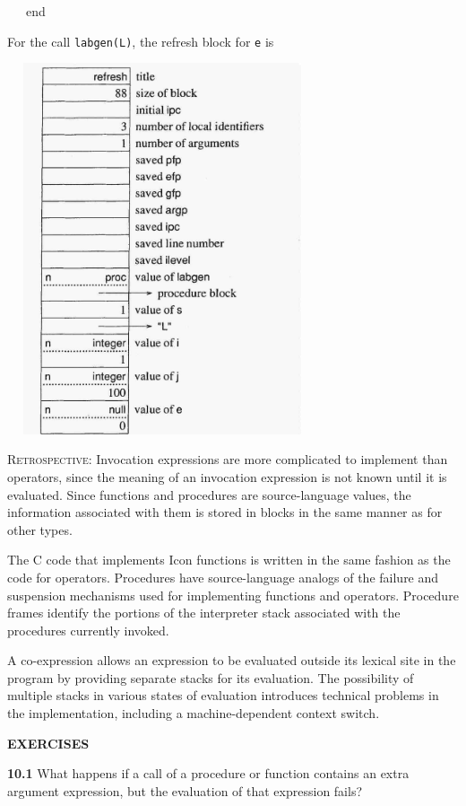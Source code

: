 {\ttfamily\mdseries
\ \ \ end}


For the call \texttt{labgen({\textquotedbl}L{\textquotedbl})}, the refresh block for \texttt{e} is


\ \  \includegraphics[width=3.3134in,height=4.3075in]{ib-img/ib-img088.jpg} 


\textsc{Retrospective}: Invocation expressions are more complicated to
implement than operators, since the meaning of an invocation
expression is not known until it is evaluated. Since functions and
procedures are source-language values, the information associated with
them is stored in blocks in the same manner as for other types.

The C code that implements Icon functions is written in the same
fashion as the code for operators. Procedures have source-language
analogs of the failure and suspension mechanisms used for implementing
functions and operators.  Procedure frames identify the portions of
the interpreter stack associated with the procedures currently
invoked.

A co-expression allows an expression to be evaluated outside its
lexical site in the program by providing separate stacks for its
evaluation. The possibility of multiple stacks in various states of
evaluation introduces technical problems in the implementation,
including a machine-dependent context switch.

\bigskip

\noindent\textbf{EXERCISES}

\textbf{10.1} What happens if a call of a procedure or function
contains an extra argument expression, but the evaluation of that
expression fails?

